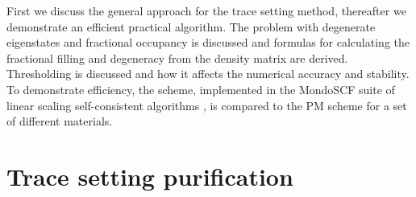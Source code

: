 \commentoutA{\documentclass[superbib,aps,prb,epsfig,floats,twocolumn]{revtex4}}
\begin{document}
First we discuss the general approach for the trace setting method,
thereafter we demonstrate an efficient practical algorithm. 
The problem with degenerate eigenstates and fractional occupancy is discussed and formulas 
for calculating the fractional filling and degeneracy from the density matrix 
are derived. Thresholding is discussed and how it affects
the numerical accuracy and stability.
To demonstrate efficiency, the scheme, implemented in the MondoSCF suite of linear 
scaling self-consistent algorithms \cite{Mondo}, is compared to the PM scheme 
for a set of different materials. 


\section{Trace setting purification}
\end{document}
